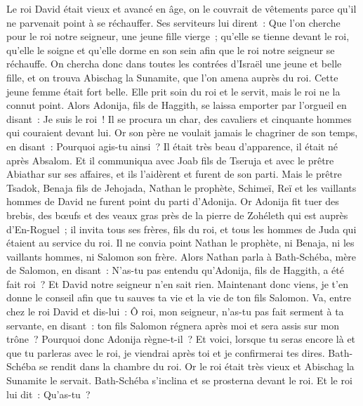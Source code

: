 \begin{multicols}{2}
\VerseOne{}Le roi David était vieux et avancé en âge, on le couvrait de vêtements parce qu'il ne parvenait point à se réchauffer.
Ses serviteurs lui dirent~: Que l'on cherche pour le roi notre seigneur, une jeune fille vierge~; qu'elle se tienne devant le roi, qu'elle le soigne et qu'elle dorme en son sein afin que le roi notre seigneur se réchauffe.
On chercha donc dans toutes les contrées d'Israël une jeune et belle fille, et on trouva Abischag la Sunamite, que l'on amena auprès du roi.
Cette jeune femme était fort belle. Elle prit soin du roi et le servit, mais le roi ne la connut point.
Alors Adonija, fils de Haggith, se laissa emporter par l'orgueil en disant~: Je suis le roi~! Il se procura un char, des cavaliers et cinquante hommes qui couraient devant lui.
Or son père ne voulait jamais le chagriner de son temps, en disant~: Pourquoi agis-tu ainsi~? Il était très beau d'apparence, il était né après Absalom.
Et il communiqua avec Joab fils de Tseruja et avec le prêtre Abiathar sur ses affaires, et ils l'aidèrent et furent de son parti.
Mais le prêtre Tsadok, Benaja fils de Jehojada, Nathan le prophète, Schimeï, Reï et les vaillants hommes de David ne furent point du parti d'Adonija.
Or Adonija fit tuer des brebis, des bœufs et des veaux gras près de la pierre de Zohéleth qui est auprès d'En-Roguel~; il invita tous ses frères, fils du roi, et tous les hommes de Juda qui étaient au service du roi.
Il ne convia point Nathan le prophète, ni Benaja, ni les vaillants hommes, ni Salomon son frère.
Alors Nathan parla à Bath-Schéba, mère de Salomon, en disant~: N'as-tu pas entendu qu'Adonija, fils de Haggith, a été fait roi~? Et David notre seigneur n'en sait rien.
Maintenant donc viens, je t'en donne le conseil afin que tu sauves ta vie et la vie de ton fils Salomon.
Va, entre chez le roi David et dis-lui~: Ô roi, mon seigneur, n'as-tu pas fait serment à ta servante, en disant~: ton fils Salomon régnera après moi et sera assis sur mon trône~? Pourquoi donc Adonija règne-t-il~?
Et voici, lorsque tu seras encore là et que tu parleras avec le roi, je viendrai après toi et je confirmerai tes dires.
Bath-Schéba se rendit dans la chambre du roi. Or le roi était très vieux et Abischag la Sunamite le servait.
Bath-Schéba s'inclina et se prosterna devant le roi. Et le roi lui dit~: Qu'as-tu~?

\end{multicols}
